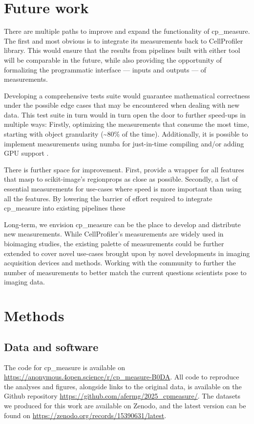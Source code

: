 \documentclass{article}
\begin{document}
\section{Future work}
\label{sec:org5cdbb12}
There are multiple paths to improve and expand the functionality of cp\_measure. The first and most obvious is to integrate its measurements back to CellProfiler library. This would ensure that the results from pipelines built with either tool will be comparable in the future, while also providing the opportunity of formalizing the programmatic interface --- inputs and outputs --- of measurements.

Developing a comprehensive tests suite would guarantee mathematical correctness under the possible edge cases that may be encountered when dealing with new data. This test suite in turn would in turn open the door to further speed-ups in multiple ways: Firstly, optimizing the measurements that consume the most time, starting with object granularity (\textasciitilde{}80\% of the time). Additionally, it is possible to implement measurements using numba for just-in-time compiling and/or adding GPU support \citep{lamNumbaLLVMbasedPython2015}.

There is further space for improvement. First, provide a wrapper for all features that masp to scikit-image's regionprops as close as possible. Secondly, a list of essential measurements for use-cases where speed is more important than using all the features. By lowering the barrier of effort required to integrate cp\_measure into existing pipelines these 

Long-term, we envision cp\_measure can be the place to develop and distribute new measurements. While CellProfiler's measurements are widely used in bioimaging studies, the existing palette of measurements could be further extended to cover novel use-cases brought upon by novel developments in imaging acquisition devices and methods. Working with the community to further the number of measurements to better match the current questions scientists pose to imaging data.
\section{Methods}
\label{sec:org91ddb3a}
\subsection{Data and software}
\label{sec:orgf44b7cd}
The code for cp\_measure is available on \url{https://anonymous.4open.science/r/cp\_measure-B0DA}. All code to reproduce the analyses and figures, alongside links to the original data, is available on the Github repository \url{https://github.com/afermg/2025\_cpmeasure/}. The datasets we produced for this work are available on Zenodo, and the latest version can be found on \url{https://zenodo.org/records/15390631/latest}.



\end{document}
